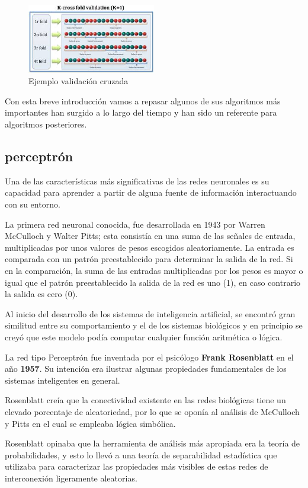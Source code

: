 \documentclass[a4paper, 11pt]{article} %
\begin{document}
\begin{figure}[H]
\centering
\includegraphics[width=0.5\textwidth]{cross}
\caption{Ejemplo validación cruzada}
\label{Grupo de Individuos}
\end{figure}
Con esta breve introducción vamos a repasar algunos de sus algoritmos más importantes han surgido a lo largo del tiempo y han sido un referente para algoritmos posteriores.

\subsection{perceptrón}
Una de las características más significativas de las redes neuronales es su capacidad para aprender a partir de alguna fuente de información interactuando con su entorno.

La primera red neuronal conocida, fue desarrollada en 1943 por Warren McCulloch y Walter Pitts; esta consistía en una suma de las señales de entrada, multiplicadas por unos valores de pesos escogidos aleatoriamente. La entrada es comparada con un patrón preestablecido para determinar la salida de la red. Si en la comparación, la suma de las entradas multiplicadas por los pesos es mayor o igual que el patrón preestablecido la salida de la red es uno (1), en caso contrario la salida es cero (0).

Al inicio del desarrollo de los sistemas de inteligencia artificial, se encontró gran similitud entre su comportamiento y el de los sistemas biológicos y en principio se creyó que este modelo podía computar cualquier función aritmética o lógica.

La red tipo Perceptrón fue inventada por el psicólogo \textbf{Frank Rosenblatt} en el año \textbf{1957}. Su intención era ilustrar algunas propiedades fundamentales de los sistemas inteligentes en general.

Rosenblatt creía que la conectividad existente en las redes biológicas tiene un elevado porcentaje de aleatoriedad, por lo que se oponía al análisis de McCulloch y Pitts en el cual se empleaba lógica simbólica.

Rosenblatt opinaba que la herramienta de análisis más apropiada era la teoría de probabilidades, y esto lo llevó a una teoría de separabilidad estadística que utilizaba para caracterizar las propiedades más visibles de estas redes de interconexión ligeramente aleatorias.
\end{document}

